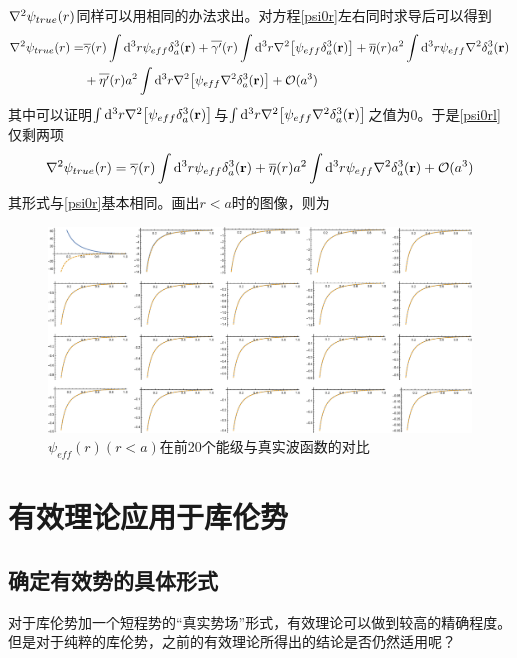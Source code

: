 \documentclass[hyperref,cs4size,titlepage,twoside]{ctexart}
\begin{document}
$\laplacian{\psi_{true}(r)}$同样可以用相同的办法求出。对方程\eqref{psi0r}左右同时求导后可以得到
\begin{alignat}{1}\label{psi0rl}
  \laplacian{\psi_{true}(r)}=&\overline{\gamma}(r)\int\dd^3r\psi_{eff}\delta^3_a(\vb{r})+\overline{\gamma'}(r)\int\dd^3r\laplacian{\bqty{\psi_{eff}\delta^3_a(\vb{r})}}+\overline{\eta}(r)a^2\int\dd^3r\psi_{eff}\laplacian{\delta^3_a(\vb{r})}
 \nonumber\\&+\overline{\eta'}(r)a^2\int\dd^3r\laplacian{\bqty{\psi_{eff}\laplacian{\delta^3_a(\vb{r})}}}+\mathcal{O}(a^3)
\end{alignat}
其中可以证明$\int\dd^3r\laplacian{\bqty{\psi_{eff}\delta^3_a(\vb{r})}}$与$\int\dd^3r\laplacian{\bqty{\psi_{eff}\laplacian{\delta^3_a(\vb{r})}}}$之值为0。于是\eqref{psi0rl}仅剩两项
\begin{equation}\label{psi0rl2}
  \laplacian{\psi_{true}(r)}=\overline{\gamma}(r)\int\dd^3r\psi_{eff}\delta^3_a(\vb{r})+\overline{\eta}(r)a^2\int\dd^3r\psi_{eff}\laplacian{\delta^3_a(\vb{r})}+\mathcal{O}(a^3)
\end{equation}
其形式与\eqref{psi0r}基本相同。画出$r<a$时的图像，则为
\begin{figure}[!htbp]
  \centering
  \includegraphics[width=6in]{psirlap.eps}
  \caption{$\psi_{eff}(r)(r<a)$在前20个能级与真实波函数的对比}
\end{figure}
\clearpage
\section{有效理论应用于库伦势}
\subsection{确定有效势的具体形式}
对于库伦势加一个短程势的“真实势场”形式，有效理论可以做到较高的精确程度。但是对于纯粹的库伦势，之前的有效理论所得出的结论是否仍然适用呢？
\end{document}
